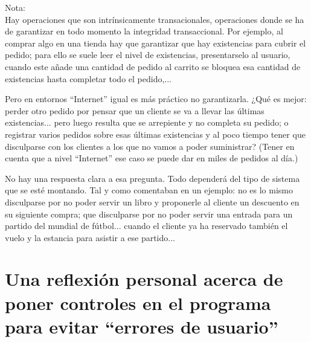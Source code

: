 \documentclass[spanish,12pt,a4paper,final,oneside]{book}
\begin{document}
\vspace{1cm}
Nota: 
\\Hay operaciones que son intrínsicamente transacionales, operaciones donde se ha de garantizar en todo momento la integridad transaccional. Por ejemplo, al comprar algo en una tienda hay que garantizar que hay existencias para cubrir el pedido; para ello se suele leer el nivel de existencias, presentarselo al usuario, cuando este añade una cantidad de pedido al carrito se bloquea esa cantidad de existencias hasta completar todo el pedido,...
 
Pero en entornos ``Internet'' igual es más práctico no garantizarla. ¿Qué es mejor: perder otro pedido por pensar que un cliente se va a llevar las últimas existencias... pero luego resulta que se arrepiente y no completa su pedido; o registrar varios pedidos sobre esas últimas existencias y al poco tiempo tener que disculparse con los clientes a los que no vamos a poder suministrar?  (Tener en cuenta que a nivel ``Internet'' ese caso se puede dar en miles de pedidos al día.)

No hay una respuesta clara a esa pregunta. Todo dependerá del tipo de sistema que se esté montando. Tal y como comentaban en un ejemplo: no es lo mismo disculparse por no poder servir un libro y proponerle al cliente un descuento en su siguiente compra; que disculparse por no poder servir una entrada para un partido del mundial de fútbol... cuando el cliente ya ha reservado también el vuelo y la estancia para asistir a ese partido...


\newpage
\section{Una reflexión personal acerca de poner controles en el programa para evitar ``errores de usuario''}
\end{document}
